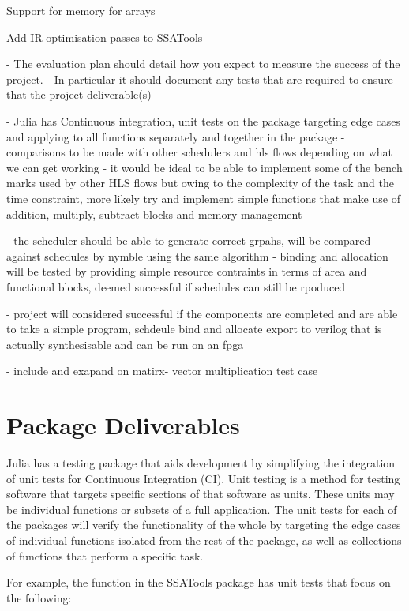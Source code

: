 Support for memory for arrays

Add IR optimisation passes to SSATools








\iffalse
- The evaluation plan should detail how you expect to measure the success of the project. 
- In particular it should document any tests that are required to ensure that the project deliverable(s)

- Julia has Continuous integration, unit tests on the package targeting edge cases and applying to all functions separately and together in the package
- comparisons to be made with other schedulers and hls flows depending on what we can get working
- it would be ideal to be able to implement some of the bench marks used by other HLS flows but owing to the complexity of the task and the time constraint, more likely try and implement simple functions that make use of addition, multiply, subtract blocks and memory management

- the scheduler should be able to generate correct grpahs, will be compared against schedules by nymble using the same algorithm
- binding and allocation will be tested by providing simple resource contraints in terms of area and functional blocks, deemed successful if schedules can still be rpoduced

- project will considered successful if the components are completed and are able to take a simple program, schdeule bind and allocate export to verilog that is actually synthesisable and can be run on an fpga

- include and exapand on matirx- vector multiplication test case


\section{Package Deliverables}
Julia has a testing package that aids development by simplifying the integration of unit tests for Continuous Integration (CI). Unit testing is a method for testing software that targets specific sections of that software as units. These units may be individual functions or subsets of a full application. The unit tests for each of the packages will verify the functionality of the whole by targeting the edge cases of individual functions isolated from the rest of the package, as well as collections of functions that perform a specific task.

For example, the  function in the SSATools package has unit tests that focus on the following:

